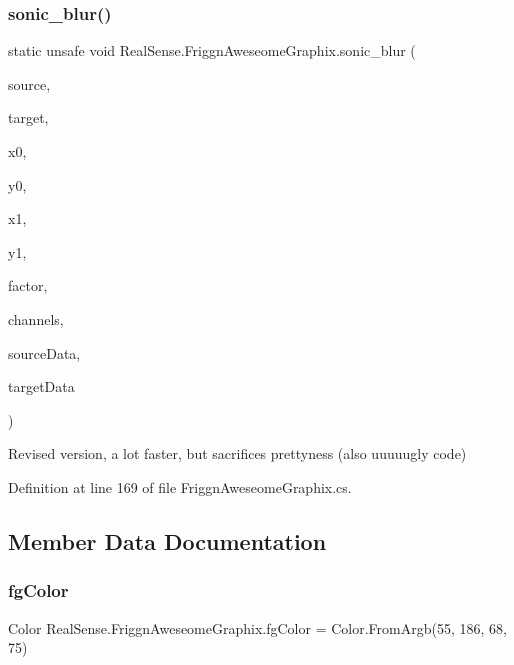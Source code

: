 \subsubsection{\texorpdfstring{sonic\+\_\+blur()}{sonic\_blur()}}
{\footnotesize\ttfamily static unsafe void Real\+Sense.\+Friggn\+Aweseome\+Graphix.\+sonic\+\_\+blur (\begin{DoxyParamCaption}\item[{Bitmap}]{source,  }\item[{Bitmap}]{target,  }\item[{int}]{x0,  }\item[{int}]{y0,  }\item[{int}]{x1,  }\item[{int}]{y1,  }\item[{int}]{factor,  }\item[{int}]{channels,  }\item[{Bitmap\+Data}]{source\+Data,  }\item[{Bitmap\+Data}]{target\+Data }\end{DoxyParamCaption})\hspace{0.3cm}{\ttfamily [static]}}

Revised version, a lot faster, but sacrifices prettyness (also uuuuugly code) 

Definition at line 169 of file Friggn\+Aweseome\+Graphix.\+cs.



\subsection{Member Data Documentation}
\mbox{\label{class_real_sense_1_1_friggn_aweseome_graphix_a167341ae00dc0a13928b8b26de77e277}} 
\subsubsection{\texorpdfstring{fg\+Color}{fgColor}}
{\footnotesize\ttfamily Color Real\+Sense.\+Friggn\+Aweseome\+Graphix.\+fg\+Color = Color.\+From\+Argb(55, 186, 68, 75)\hspace{0.3cm}{\ttfamily [static]}}



